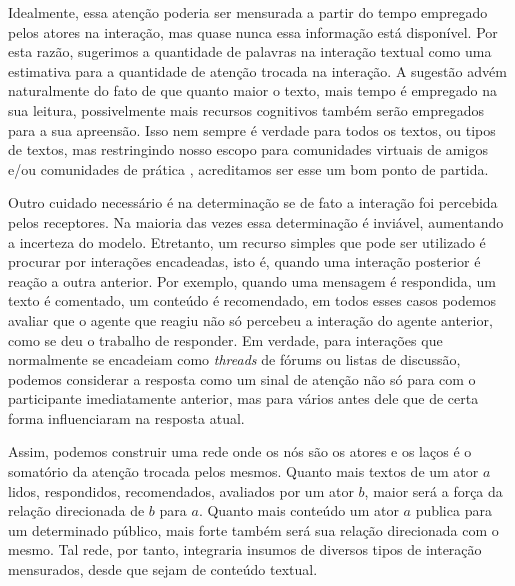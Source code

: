 \documentclass{article}
\begin{document}
Idealmente, essa atenção poderia ser mensurada a partir do tempo empregado pelos
atores na interação, mas quase nunca essa informação está disponível. Por esta
razão, sugerimos a quantidade de palavras na interação textual como uma
estimativa para a quantidade de atenção trocada na interação. A sugestão advém
naturalmente do fato de que quanto maior o texto, mais tempo é empregado na sua
leitura, possivelmente mais recursos cognitivos também serão empregados para a
sua apreensão. Isso nem sempre é verdade para todos os textos, ou tipos de
textos, mas restringindo nosso escopo para comunidades virtuais de amigos e/ou
comunidades de prática \cite{Lave1991} \cite{Lave1991a}, acreditamos ser esse um
bom ponto de partida.

Outro cuidado necessário é na determinação se de fato a interação foi percebida
pelos receptores. Na maioria das vezes essa determinação é inviável, aumentando
a incerteza do modelo. Etretanto, um recurso simples que pode ser utilizado é
procurar por interações encadeadas, isto é, quando uma interação posterior é 
reação a outra anterior. Por exemplo, quando uma mensagem é respondida, um texto
é comentado, um conteúdo é recomendado, em todos esses casos podemos avaliar que
o agente que reagiu não só percebeu a interação do agente anterior, como se deu
o trabalho de responder. Em verdade, para interações que normalmente se
encadeiam como \textit{threads} de fórums ou listas de discussão, podemos
considerar a resposta como um sinal de atenção não só para com o participante
imediatamente anterior, mas para vários antes dele que de certa forma
influenciaram na resposta atual.

Assim, podemos construir uma rede onde os nós são os atores e os laços é o
somatório da atenção trocada pelos mesmos. Quanto mais textos de um ator $a$
lidos, respondidos, recomendados, avaliados por um ator $b$, maior será a força
da relação direcionada de $b$ para $a$. Quanto mais conteúdo um ator $a$ publica
para um determinado público, mais forte também será sua relação direcionada
com o mesmo. Tal rede, por tanto, integraria insumos de diversos tipos de
interação mensurados, desde que sejam de conteúdo textual.
\end{document}
